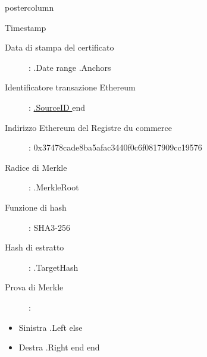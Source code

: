\documentclass[roundedcorners=true, titleposition=center]{beamerthemeruhuisstijlposter}
\begin{document}
\begin{frame}
\begin{columns}
\begin{column}{0.95\textwidth}
\begin{beamercolorbox}[center, wd=\textwidth]{postercolumn}
\begin{minipage}[T]{0.95\textwidth}
    \hfill
\parbox[t][\columnheight]{\textwidth}{%

\begin{block}{Timestamp}
\begin{description}
\item [Data di stampa del certificato] :\linebreak
{{ .Date }}
{{ range .Anchors }}
\item [Identificatore transazione Ethereum] :\linebreak
\href{https://etherscan.io/tx/0x{{ .SourceID }} }{ {{.SourceID }} }
{{ end }}
\item[Indirizzo Ethereum del Registre du commerce
] :\linebreak
0x37478cade8ba5afac3440f0c6f0817909cc19576
\item[Radice di Merkle] :\linebreak
{{ .MerkleRoot }}
\item[Funzione di hash] : \linebreak
SHA3-256
\item[Hash di estratto] :\linebreak
{{ .TargetHash }}
\item[Prova di Merkle] :
\end{description}
\begin{itemize}
{{ range .Proof }}
    {{ if .Left }}
        \item Sinistra {{ .Left }}
    {{ else }}
        \item Destra {{ .Right }}
    {{ end }}
{{ end }}
\end{itemize}
\end{block}
}
\end{minipage}
\end{beamercolorbox}
\end{column}
\end{columns}
\end{frame}
\end{document}
